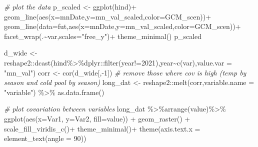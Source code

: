 \documentclass[
]{article}
\newenvironment{Shaded}{\begin{snugshade}}{\end{snugshade}}
\newcommand{\AttributeTok}[1]{\textcolor[rgb]{0.77,0.63,0.00}{#1}}
\newcommand{\CommentTok}[1]{\textcolor[rgb]{0.56,0.35,0.01}{\textit{#1}}}
\newcommand{\DecValTok}[1]{\textcolor[rgb]{0.00,0.00,0.81}{#1}}
\newcommand{\FunctionTok}[1]{\textcolor[rgb]{0.00,0.00,0.00}{#1}}
\newcommand{\NormalTok}[1]{#1}
\newcommand{\OtherTok}[1]{\textcolor[rgb]{0.56,0.35,0.01}{#1}}
\newcommand{\SpecialCharTok}[1]{\textcolor[rgb]{0.00,0.00,0.00}{#1}}
\newcommand{\StringTok}[1]{\textcolor[rgb]{0.31,0.60,0.02}{#1}}
\begin{document}
\begin{Shaded}
\begin{Highlighting}[]
      \CommentTok{\# plot the data}
\NormalTok{       p\_scaled }\OtherTok{\textless{}{-}} \FunctionTok{ggplot}\NormalTok{(hind)}\SpecialCharTok{+}
         \FunctionTok{geom\_line}\NormalTok{(}\FunctionTok{aes}\NormalTok{(}\AttributeTok{x=}\NormalTok{mnDate,}\AttributeTok{y=}\NormalTok{mn\_val\_scaled,}\AttributeTok{color=}\NormalTok{GCM\_scen))}\SpecialCharTok{+}
         \FunctionTok{geom\_line}\NormalTok{(}\AttributeTok{data=}\NormalTok{fut,}\FunctionTok{aes}\NormalTok{(}\AttributeTok{x=}\NormalTok{mnDate,}\AttributeTok{y=}\NormalTok{mn\_val\_scaled,}\AttributeTok{color=}\NormalTok{GCM\_scen))}\SpecialCharTok{+}
         \FunctionTok{facet\_wrap}\NormalTok{(.}\SpecialCharTok{\textasciitilde{}}\NormalTok{var,}\AttributeTok{scales=}\StringTok{"free\_y"}\NormalTok{)}\SpecialCharTok{+}
         \FunctionTok{theme\_minimal}\NormalTok{()}
\NormalTok{      p\_scaled}
      
\NormalTok{      d\_wide }\OtherTok{\textless{}{-}}\NormalTok{ reshape2}\SpecialCharTok{::}\FunctionTok{dcast}\NormalTok{(hind}\SpecialCharTok{\%\textgreater{}\%}\NormalTok{dplyr}\SpecialCharTok{::}\FunctionTok{filter}\NormalTok{(year}\SpecialCharTok{!=}\DecValTok{2021}\NormalTok{),year}\SpecialCharTok{\textasciitilde{}}\FunctionTok{c}\NormalTok{(var),}\AttributeTok{value.var =} \StringTok{"mn\_val"}\NormalTok{)}
\NormalTok{      corr   }\OtherTok{\textless{}{-}} \FunctionTok{cor}\NormalTok{(d\_wide[,}\SpecialCharTok{{-}}\DecValTok{1}\NormalTok{])}
      \CommentTok{\# remove those where cov is high (temp by season and cold pool by season)}
\NormalTok{      long\_dat }\OtherTok{\textless{}{-}}\NormalTok{ reshape2}\SpecialCharTok{::}\FunctionTok{melt}\NormalTok{(corr,}\AttributeTok{variable.name =} \StringTok{"variable"}\NormalTok{) }\SpecialCharTok{\%\textgreater{}\%} 
      \FunctionTok{as.data.frame}\NormalTok{() }
      
      \CommentTok{\# plot covariation between variables}
\NormalTok{      long\_dat }\SpecialCharTok{\%\textgreater{}\%}\FunctionTok{arrange}\NormalTok{(value)}\SpecialCharTok{\%\textgreater{}\%}
      \FunctionTok{ggplot}\NormalTok{(}\FunctionTok{aes}\NormalTok{(}\AttributeTok{x=}\NormalTok{Var1, }\AttributeTok{y=}\NormalTok{Var2, }\AttributeTok{fill=}\NormalTok{value)) }\SpecialCharTok{+} 
      \FunctionTok{geom\_raster}\NormalTok{() }\SpecialCharTok{+} 
      \FunctionTok{scale\_fill\_viridis\_c}\NormalTok{()}\SpecialCharTok{+}
      \FunctionTok{theme\_minimal}\NormalTok{()}\SpecialCharTok{+}
      \FunctionTok{theme}\NormalTok{(}\AttributeTok{axis.text.x =} \FunctionTok{element\_text}\NormalTok{(}\AttributeTok{angle =} \DecValTok{90}\NormalTok{))}


\end{Highlighting}
\end{Shaded}
\end{document}

